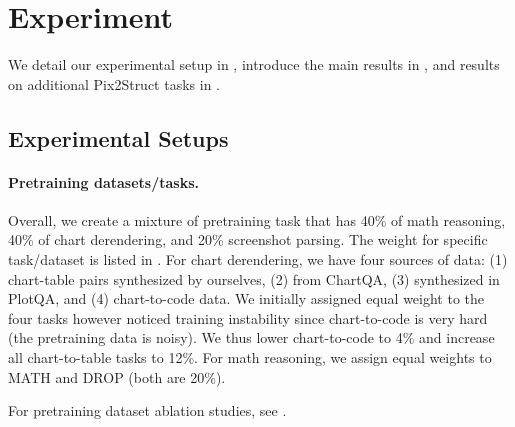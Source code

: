 
\section{Experiment}\label{sec:exp}
We detail our experimental setup in , introduce the main results in , and results on additional Pix2Struct tasks in .

\subsection{Experimental Setups}\label{sec:exp_setups}

\paragraph{Pretraining datasets/tasks.} Overall, we create a mixture of pretraining task that has 40\% of math reasoning, 40\% of chart derendering, and 20\% screenshot parsing. The weight for specific task/dataset is listed in . For chart derendering, we have four sources of data: (1) chart-table pairs synthesized by ourselves, (2) from ChartQA, (3) synthesized in PlotQA, and (4) chart-to-code data. We initially assigned equal weight to the four tasks however noticed training instability since chart-to-code is very hard (the pretraining data is noisy). We thus lower chart-to-code to 4\% and increase all chart-to-table tasks to 12\%. For math reasoning, we assign equal weights to MATH and DROP (both are 20\%).

For pretraining dataset ablation studies, see .

\begin{table}[t!]
    \small
    \centering
\caption{Mixture rates for all tasks in pretraining and the absolute size of each dataset. The mixture rate is used to sample each example within the batch.}
\label{tab:mixture_rate}
\end{table}

